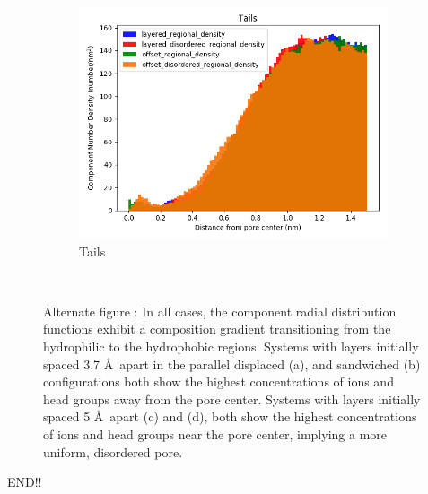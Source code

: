 \documentclass{article}
\begin{document}
\begin{figure}
\begin{subfigure}{0.32\textwidth}
        \includegraphics[width=1\linewidth]{tails_density.png}
        \caption{Tails}
        \label{fig:tails_regional_density}
  \end{subfigure}
  \caption{Alternate figure : In all cases, the component radial distribution functions exhibit a
	  composition gradient transitioning from the hydrophilic to the hydrophobic
	  regions. Systems with layers initially spaced 3.7 \AA~apart in the  parallel
	  displaced (a), and sandwiched (b) configurations both show the highest
	  concentrations of ions and head groups away from the pore center. Systems with
	  layers initially spaced 5 \AA~apart (c) and (d), both show the highest
	  concentrations of ions and head groups near the pore center, implying a more
	  uniform, disordered pore.}~\label{fig:overlaid_densities}
  \end{figure}

  END!!
  
\end{document}

